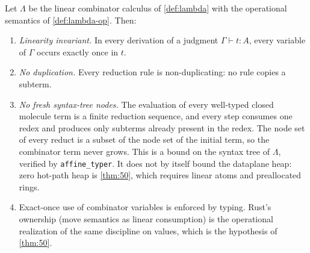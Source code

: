 \begin{theorem}\label{thm:55}
Let $\Lambda$ be the linear combinator calculus of \autoref{def:lambda} with the operational semantics of \autoref{def:lambda-op}. Then:
\begin{enumerate}
\item[(i)] \emph{Linearity invariant.} In every derivation of a judgment $\Gamma \vdash t : A$, every variable of $\Gamma$ occurs exactly once in $t$.
\item[(ii)] \emph{No duplication.} Every reduction rule is non-duplicating: no rule copies a subterm.
\item[(iii)] \emph{No fresh syntax-tree nodes.} The evaluation of every well-typed closed molecule term is a finite reduction sequence, and every step consumes one redex and produces only subterms already present in the redex. The node set of every reduct is a subset of the node set of the initial term, so the combinator term never grows. This is a bound on the syntax tree of $\Lambda$, verified by \texttt{affine\_typer}. It does not by itself bound the dataplane heap: zero hot-path heap is \autoref{thm:50}, which requires linear atoms and preallocated rings.
\item[(iv)] Exact-once use of combinator variables is enforced by typing. Rust's ownership (move semantics as linear consumption) is the operational realization of the same discipline on values, which is the hypothesis of \autoref{thm:50}.
\end{enumerate}
\end{theorem}

